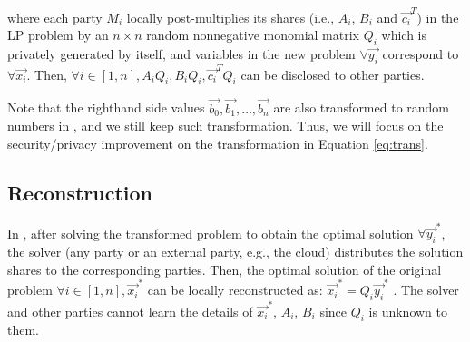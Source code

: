 where each party $M_i$ locally post-multiplies its shares (i.e., $A_i$, $B_i$ and $\vec{c_i}^T$) in the LP problem by an $n\times n$ random nonnegative monomial matrix $Q_i$ \cite{HongJCS12} which is privately generated by itself, and variables in the new problem $\forall \vec{y_i}$ correspond to $\forall \vec{x_i}$. Then, $\forall i\in[1,n], A_iQ_i, B_iQ_i, \vec{c_i}^TQ_i$ can be disclosed to other parties.

Note that the righthand side values $\vec{b_0},\vec{b_1},\dots,\vec{b_n}$ are also transformed to random numbers in \cite{HongIJER15}, and we still keep such transformation. Thus, we will focus on the security/privacy improvement on the transformation in Equation \ref{eq:trans}.

\subsection{Reconstruction}

In \cite{HongIJER15}, after solving the transformed problem to obtain the optimal solution $\forall \vec{y_i}^*$, the solver (any party or an external party, e.g., the cloud) distributes the solution shares to the corresponding parties. Then, the optimal solution of the original problem $\forall i\in[1,n], \vec{x_i}^*$ can be locally reconstructed as: $\vec{x_i}^*=Q_i\vec{y_i}^*$ \cite{HongIJER15,HongDBsec,HongJCS12}. The solver and other parties cannot learn the details of $\vec{x_i}^*$, $A_i$, $B_i$ since $Q_i$ is unknown to them. 


